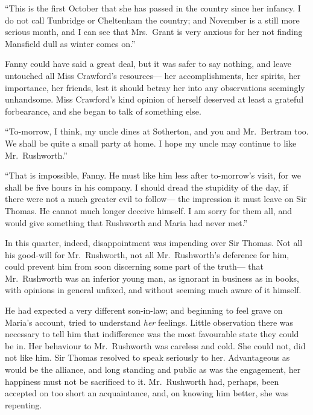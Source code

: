 ``This is the first October that she has passed in the country
since her infancy.  I do not call Tunbridge or Cheltenham
the country; and November is a still more serious month,
and I can see that Mrs.\ Grant is very anxious for her
not finding Mansfield dull as winter comes on.''

Fanny could have said a great deal, but it was safer to
say nothing, and leave untouched all Miss Crawford's resources---%
her accomplishments, her spirits, her importance,
her friends, lest it should betray her into any observations
seemingly unhandsome.  Miss Crawford's kind opinion
of herself deserved at least a grateful forbearance,
and she began to talk of something else.

``To-morrow, I think, my uncle dines at Sotherton, and you
and Mr.\ Bertram too.  We shall be quite a small party at home.
I hope my uncle may continue to like Mr.\ Rushworth.''

``That is impossible, Fanny.  He must like him less
after to-morrow's visit, for we shall be five hours
in his company.  I should dread the stupidity of the day,
if there were not a much greater evil to follow---%
the impression it must leave on Sir Thomas.  He cannot much
longer deceive himself.  I am sorry for them all, and would
give something that Rushworth and Maria had never met.''

In this quarter, indeed, disappointment was impending
over Sir Thomas.  Not all his good-will for Mr.\ Rushworth,
not all Mr.\ Rushworth's deference for him, could prevent
him from soon discerning some part of the truth---%
that Mr.\ Rushworth was an inferior young man, as ignorant
in business as in books, with opinions in general unfixed,
and without seeming much aware of it himself.

He had expected a very different son-in-law; and beginning
to feel grave on Maria's account, tried to understand
\emph{her} feelings.  Little observation there was necessary
to tell him that indifference was the most favourable
state they could be in.  Her behaviour to Mr.\ Rushworth
was careless and cold.  She could not, did not like him.
Sir Thomas resolved to speak seriously to her.
Advantageous as would be the alliance, and long standing
and public as was the engagement, her happiness must not be
sacrificed to it.  Mr.\ Rushworth had, perhaps, been accepted
on too short an acquaintance, and, on knowing him better,
she was repenting.


